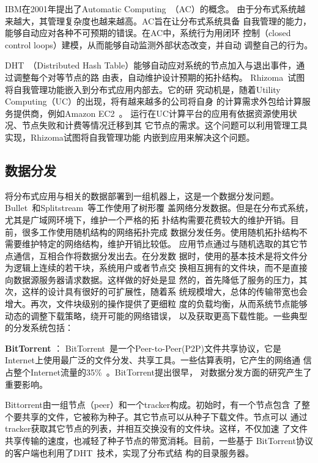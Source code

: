 IBM在2001年提出了Automatic Computing~\cite{Kephart2003}（AC）的概念。
由于分布式系统越来越大，其管理复杂度也越来越高。AC旨在让分布式系统具备
自我管理的能力，能够自动应对各种不可预期的错误。在AC中，系统行为用闭环
控制（closed control loops）建模，从而能够自动监测外部状态改变，并自动
调整自己的行为。

DHT~\cite{can, pastry, tapestry, chord, kademlia}（Distributed Hash
Table）能够自动应对系统的节点加入与退出事件，通过调整每个对等节点的路
由表，自动维护设计预期的拓扑结构。
Rhizoma~\cite{Rhizoma}试图将自我管理功能嵌入到分布式应用内部去。它的研
究动机是，随着Utility Computing（UC）的出现，将有越来越多的公司将自身
的计算需求外包给计算服务提供商，例如Amazon EC2~\cite{Garfinkel2007}。
运行在UC计算平台的应用有依据资源使用状况、节点失败和计费等情况迁移到其
它节点的需求。这个问题可以利用管理工具实现，Rhizoma试图将自我管理功能
内嵌到应用来解决这个问题。

\subsection{数据分发}
\label{sec:related:datadistro}

将分布式应用与相关的数据部署到一组机器上，这是一个数据分发问题。
Bullet~\cite{bullet}和Splitstream~\cite{splitstream}等工作使用了树形覆
盖网络分发数据。但是在分布式系统，尤其是广域网环境下，维护一个严格的拓
扑结构需要花费较大的维护开销。目前，很多工作使用随机结构的网络拓扑完成
数据分发任务。使用随机拓扑结构不需要维护特定的网络结构，维护开销比较低。
应用节点通过与随机选取的其它节点通信，互相合作将数据分发出去。在分发数
据时，使用的基本技术是将文件分为逻辑上连续的若干块，系统用户或者节点交
换相互拥有的文件块，而不是直接向数据源服务器请求数据。这样做的好处是显
然的，首先降低了服务的压力，其次，这样的设计具有很好的可扩展性，随着系
统规模增大，总体的传输带宽也会增大。再次，文件块级别的操作提供了更细粒
度的负载均衡，从而系统节点能够动态的调整下载策略，绕开可能的网络错误，
以及获取更高下载性能。一些典型的分发系统包括：

\textbf{BitTorrent} ：
BitTorrent~\cite{bittorrent}是一个Peer-to-Peer(P2P)文件共享协议，它是
Internet上使用最广泛的文件分发、共享工具。一些估算表明，它产生的网络通
信占整个Internet流量的35\%~\cite{bt2004}。BitTorrent提出很早，
对数据分发方面的研究产生了重要影响。

Bittorrent由一组节点（peer）和一个tracker构成。初始时，有一个节点包含
了整个要共享的文件，它被称为种子。其它节点可以从种子下载文件。节点可以
通过tracker获取其它节点的列表，并相互交换没有的文件块。这样，不仅加速
了文件共享传输的速度，也减轻了种子节点的带宽消耗。目前，一些基于
BitTorrent协议的客户端也利用了DHT~\cite{kademlia}技术，实现了分布式结
构的目录服务器。

